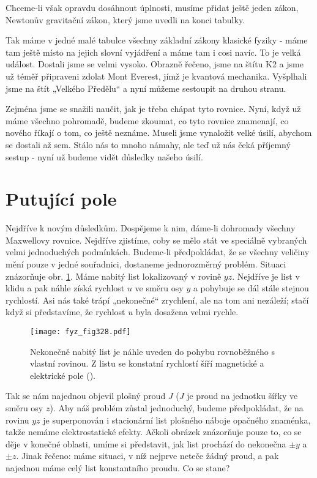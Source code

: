   Chceme-li však opravdu dosáhnout úplnosti, musíme přidat ještě jeden zákon, Newtonův gravitační 
  zákon, který jsme uvedli na konci tabulky.

  Tak máme v jedné malé tabulce všechny základní zákony klasické fyziky - máme tam ještě místo 
  na jejich slovní vyjádření a máme tam i cosi navíc. To je velká událost. Dostali jsme se velmi 
  vysoko. Obrazně řečeno, jsme na štítu K2 a jsme už téměř připraveni zdolat Mont Everest, jímž je 
  kvantová mechanika. Vyšplhali jsme na štít „Velkého Předělu“ a nyní můžeme sestoupit na druhou 
  stranu.
  
  Zejména jsme se snažili naučit, jak je třeba chápat tyto rovnice. Nyní, když už máme všechno 
  pohromadě, budeme zkoumat, co tyto rovnice znamenají, co nového říkají o tom, co ještě neznáme. 
  Museli jsme vynaložit velké úsilí, abychom se dostali až sem. Stálo nás to mnoho námahy, ale teď 
  už nás čeká příjemný sestup - nyní už budeme vidět důsledky našeho úsilí.
  
\section{Putující pole}\label{fyz:IIchapXVIIIsecIII}
  Nejdříve k novým důsledkům. Dospějeme k nim, dáme-li dohromady všechny Maxwellovy rovnice. 
  Nejdříve zjistíme, coby se mělo stát ve speciálně vybraných velmi jednoduchých podmínkách. 
  Budemc-li předpokládat, že se všechny veličiny mění pouze v jedné souřadnici, dostaneme 
  jednorozměrný problém. Situaci znázorňuje obr. \ref{fyz:fig328}. Máme nabitý list lokalizovaný v 
  rovině \(yz\). Nejdříve je list v klidu a pak náhle získá rychlost \(u\) ve směru osy \(y\) a 
  pohybuje se dál stále stejnou rychlostí. Asi nás také trápí „nekonečné“ zrychlení, ale na tom ani 
  nezáleží; stačí když si představíme, že rychlost \(u\) byla dosažena velmi rychle.

  \begin{figure}[ht!]  %
    \centering
    \texttt{[image: fyz\_fig328.pdf]}
    \caption{Nekonečně nabitý list je náhle uveden do pohybu rovnoběžného s vlastní rovinou. Z listu
             se konstatní rychlostí šíří magnetické a elektrické pole
             (\cite[s.~323]{Feynman02}).}
    \label{fyz:fig328}
  \end{figure}

  Tak se nám najednou objevil plošný proud \(J\) (\(J\) je proud na jednotku šířky ve směru osy 
  \(z\)). Aby náš problém zůstal jednoduchý, budeme předpokládat, že na rovinu \(yz\) je 
  superponován i stacionární list plošného náboje opačného znaménka, takže nemáme elektrostatické 
  efekty. Ačkoli obrázek znázorňuje pouze to, co se děje v konečné oblasti, umíme si představit, 
  jak list prochází do nekonečna \(\pm y\) a \(\pm z\). Jinak řečeno: máme situaci, v níž nejprve 
  neteče žádný proud, a pak najednou máme celý list konstantního proudu. Co se stane?
  
